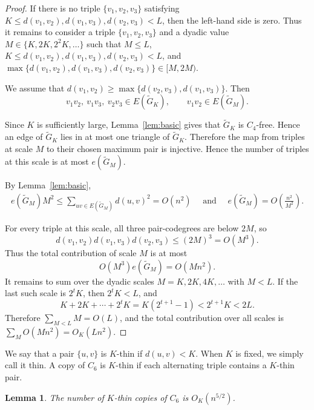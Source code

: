 \documentclass[11pt,letterpaper]{article}
\newtheorem{lemma}[theorem]{Lemma}
\begin{document}
\begin{proof}
If there is no triple \(\{v_1,v_2,v_3\}\) satisfying
 $ K\le d(v_1,v_2),d(v_1,v_3),d(v_2,v_3)<L$,
then the left-hand side is zero. Thus it remains to consider a triple \(\{v_1,v_2,v_3\}\) and
a dyadic value \(M\in\{K,2K,2^2K,\ldots\}\) such that \(M\le L\),
\(K\le d(v_1,v_2),d(v_1,v_3),d(v_2,v_3)<L\), and
\(\max\{d(v_1,v_2),d(v_1,v_3),d(v_2,v_3)\}\in[M,2M)\).

We assume that $d(v_1,v_2)\ge\max\{d(v_2,v_3),d(v_1,v_3)\}$. Then
\[
  v_1v_2,\ v_1v_3,\ v_2v_3\in E(\tilde{G}_K),
  \qquad
  v_1v_2\in E(\tilde{G}_M).
\]

Since \(K\) is sufficiently large, Lemma~\ref{lem:basic} gives that \(\tilde{G}_K\) is \(C_4\)-free.
Hence an edge of \(\tilde{G}_K\) lies in at most one triangle of \(\tilde{G}_K\). Therefore the map from
triples at scale \(M\) to their chosen maximum pair is injective. Hence the number of triples at this
scale is at most \(e(\tilde{G}_M)\).

By Lemma~\ref{lem:basic},
\begin{align*}
   e(\tilde{G}_M)M^2\le\sum_{uv\in E(\tilde{G}_M)}d(u,v)^2=O(n^2)
   \quad\text{ and }\quad
   e(\tilde{G}_M)=O(\frac{n^2}{M^2}).
\end{align*}
 
For every triple at this scale, all three pair-codegrees are below \(2M\), so
\[
  d(v_1,v_2)d(v_1,v_3)d(v_2,v_3)\le (2M)^3=O(M^3).
\]
Thus the total contribution of scale \(M\) is at most
\[
  O(M^3)e(\tilde{G}_M)=O(Mn^2).
\]
It remains to sum over the dyadic scales \(M=K,2K,4K,\ldots\) with \(M<L\). If the last such
scale is \(2^tK\), then \(2^tK<L\), and
\[
  K+2K+\cdots+2^tK
  =K(2^{t+1}-1)
  <2^{t+1}K
  <2L.
\]
Therefore \(\sum_{M<L}M=O(L)\), and the total contribution over all scales is \(\sum_MO(Mn^2)=O_K(Ln^2)\).
\end{proof}

We say that a pair \(\{u,v\}\) is \(K\)-thin if \(d(u,v)<K\). When \(K\) is fixed, we simply call it
thin. A copy of \(C_6\) is \(K\)-thin if each alternating triple contains a \(K\)-thin pair.

\begin{lemma}\label{lem:thin}
The number of \(K\)-thin copies of \(C_6\) is $O_K(n^{5/2})$.
\end{lemma}
\end{document}
